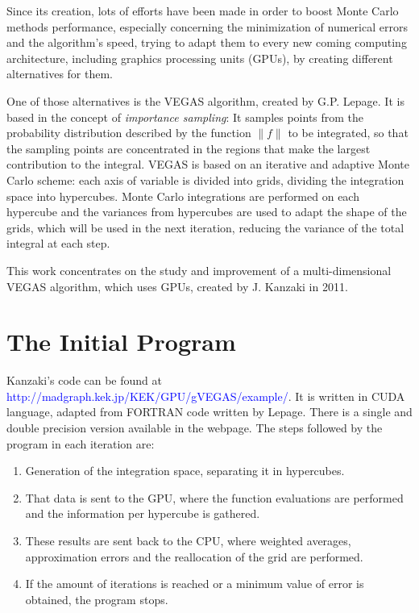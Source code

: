 \documentclass[english]{maciarticle}
\begin{document}
Since its creation, lots of efforts have been made in order to boost Monte Carlo methods performance, especially concerning the minimization of numerical errors and the algorithm's speed, trying to adapt them to every new coming computing architecture, including graphics processing units (GPUs), by creating different alternatives for them\cite{montesurvey}.

One of those alternatives is the VEGAS algorithm, created by G.P. Lepage\cite{vegas}. It is based in the concept of \textit{importance sampling}: It samples points from the probability distribution described by the function $\|f\|$ to be integrated, so that the sampling points are concentrated in the regions that make the largest contribution to the integral. VEGAS is based on an iterative and adaptive Monte Carlo scheme: each axis of variable is divided into grids, dividing the integration space into hypercubes. Monte Carlo integrations are performed on each hypercube and the variances from hypercubes are used to adapt the shape of the grids, which will be used in the next iteration, reducing the variance of the total integral at each step.

This work concentrates on the study and improvement of a multi-dimensional VEGAS algorithm, which uses GPUs, created by J. Kanzaki in 2011\cite{kanzaki}.

\section{The Initial Program} 
Kanzaki's code can be found at \textcolor{blue}{http://madgraph.kek.jp/KEK/GPU/gVEGAS/example/}. It is written in CUDA language, adapted from FORTRAN code written by Lepage\cite{lepagecode}. There is a single and double precision version available in the webpage. The steps followed by the program in each iteration are:

\begin{enumerate}
	\item Generation of the integration space, separating it in hypercubes.
	\item That data is sent to the GPU, where the function evaluations are performed and the information per hypercube is gathered.
	\item These results are sent back to the CPU, where weighted averages, approximation errors and the reallocation of the grid are performed.
	\item If the amount of iterations is reached or a minimum value of error is obtained, the program stops.
\end{enumerate} 
\end{document}

